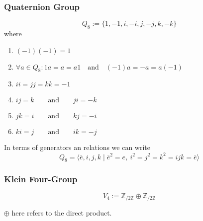 \subsubsection{Quaternion Group}
\begin{definition}
   \[Q_8 := \{1, -1, i, -i, j, -j, k, -k\}\]
   where
   \begin{enumerate}[label=\roman*, align=Center]
      \item \((-1)(-1) = 1\)
      \item \(\forall a \in Q_8: 1a = a = a1 \quad\text{and}\quad (-1)a = -a = a(-1)\)
      \item \(ii = jj = kk = -1\)
      \item \(ij = k \qquad\text{and}\qquad ji = -k\)
      \item \(jk = i \qquad\text{and}\qquad kj = -i\)
      \item \(ki = j \qquad\text{and}\qquad ik = -j\)
   \end{enumerate}
\end{definition}
\begin{remark}
   In terms of generators an relations we can write
   \[Q_8 = \langle \bar{e},i,j,k \mid \bar{e}^{2} = e,~ i^2 = j^2 = k^2 = ijk = \bar{e}\rangle\]
\end{remark}

\subsubsection{Klein Four-Group}
\begin{definition}
   \[V_4 := \mathbb{Z}_{/2\mathbb{Z}} \oplus \mathbb{Z}_{/2\mathbb{Z}}\]
\end{definition}
\begin{remark}
   \(\oplus\) here refers to the direct product.
\end{remark}

\newpage

